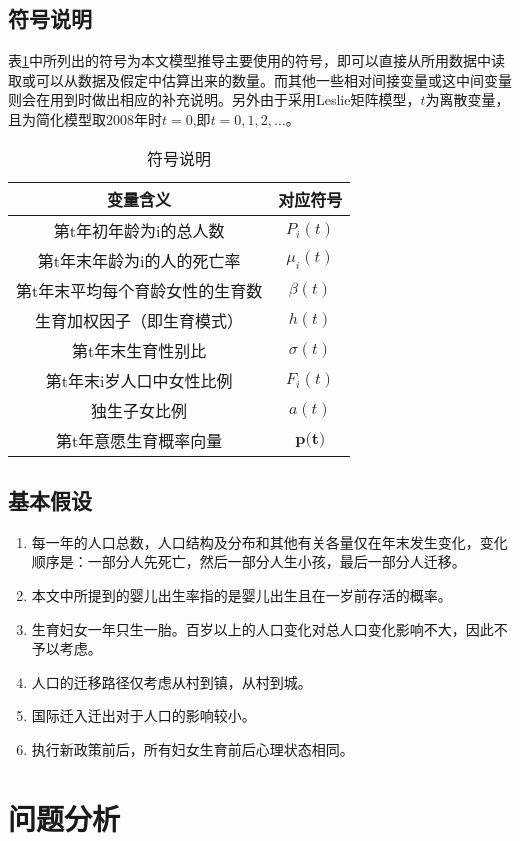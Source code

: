 \documentclass[a4paper]{article}
\begin{document}
\subsection{符号说明}
表\ref{tab:marks}中所列出的符号为本文模型推导主要使用的符号，即可以直接从所用数据中读取或可以从数据及假定中估算出来的数量。而其他一些相对间接变量或这中间变量则会在用到时做出相应的补充说明。另外由于采用Leslie矩阵模型，$t$为离散变量，且为简化模型取2008年时$t=0$,即$t=0,1,2,\ldots$。
\begin{table}[h!]
\centering
\begin{tabular}{c c}
 \hline
 变量含义 & 对应符号 \\ [0.5ex]
 \hline
 第t年初年龄为i的总人数 & $P_i(t)$ \\
 第t年末年龄为i的人的死亡率 & $\mu_i(t)$ \\
 第t年末平均每个育龄女性的生育数 & $\beta(t)$ \\
 生育加权因子（即生育模式）& $h(t)$ \\
 第t年末生育性别比 & $\sigma(t)$ \\
 第t年末i岁人口中女性比例 & $F_i(t)$ \\
 独生子女比例 & $a(t)$ \\
 第t年意愿生育概率向量 & $\textbf{p(t)}$ \\ [.5ex]
 \hline
\end{tabular}
\caption{符号说明}
\label{tab:marks}
\end{table}
\subsection{基本假设}%
\begin{enumerate}
\item 每一年的人口总数，人口结构及分布和其他有关各量仅在年末发生变化，变化顺序是：一部分人先死亡，然后一部分人生小孩，最后一部分人迁移。
\item 本文中所提到的婴儿出生率指的是婴儿出生且在一岁前存活的概率。
\item 生育妇女一年只生一胎。百岁以上的人口变化对总人口变化影响不大，因此不予以考虑。
\item 人口的迁移路径仅考虑从村到镇，从村到城。
\item 国际迁入迁出对于人口的影响较小。
\item 执行新政策前后，所有妇女生育前后心理状态相同。
\end{enumerate}
\section{问题分析}
\end{document}
